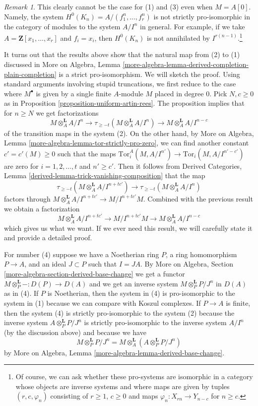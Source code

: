 \documentclass{stacks-project}
\theoremstyle{plain}
\theoremstyle{definition}
\theoremstyle{remark}
\newtheorem{remark}[subsection]{Remark}
\numberwithin{equation}{subsection}
\begin{document}
\begin{remark}
\medskip\noindent
This clearly cannot be the case for (1) and (3) even when $M = A[0]$.
Namely, the system $H^0(K_n) = A/(f_1^n, \ldots, f_r^n)$ is not strictly
pro-isomorphic in the category of modules to the system $A/I^n$ in general.
For example, if we take $A = \mathbf{Z}[x_1, \ldots, x_r]$ and $f_i = x_i$,
then $H^0(K_n)$ is not annihilated by $I^{r(n - 1)}$.\footnote{Of
course, we can ask whether these pro-systems are isomorphic in
a category whose objects are inverse systems and where maps are given
by tuples $(r, c, \varphi_n)$ consisting of $r \geq 1$, $c \geq 0$
and maps $\varphi_n : X_{rn} \to Y_{n - c}$ for $n \geq c$.}

\medskip\noindent
It turns out that the results above show that the natural map from
(2) to (1) discussed in More on Algebra, Lemma
\ref{more-algebra-lemma-derived-completion-plain-completion}
is a strict pro-isomorphism. We will sketch the proof.
Using standard arguments involving stupid truncations, we first reduce
to the case where $M^\bullet$ is given by a single finite $A$-module
$M$ placed in degree $0$. Pick $N, c \geq 0$ as in
Proposition \ref{proposition-uniform-artin-rees}.
The proposition implies that for $n \geq N$ we get factorizations
$$
M \otimes_A^\mathbf{L} A/I^n
\to
\tau_{\geq -t}(M \otimes_A^\mathbf{L} A/I^n)
\to
M \otimes_A^\mathbf{L} A/I^{n - c}
$$
of the transition maps in the system (2). On the other hand, by
More on Algebra, Lemma \ref{more-algebra-lemma-tor-strictly-pro-zero},
we can find another constant $c' = c'(M) \geq 0$ such that the maps
$\text{Tor}_i^A(M, A/I^{n'}) \to \text{Tor}_i(M, A/I^{n' - c'})$
are zero for $i = 1, 2, \ldots, t$ and $n' \geq c'$. Then it follows from
Derived Categories, Lemma \ref{derived-lemma-trick-vanishing-composition}
that the map
$$
\tau_{\geq -t}(M \otimes_A^\mathbf{L} A/I^{n + tc'})
\to
\tau_{\geq -t}(M \otimes_A^\mathbf{L} A/I^n)
$$
factors through $M \otimes_A^\mathbf{L}A/I^{n + tc'} \to M/I^{n + tc'}M$.
Combined with the previous result we obtain a factorization
$$
M \otimes_A^\mathbf{L}A/I^{n + tc'} \to M/I^{n + tc'}M
\to M \otimes_A^\mathbf{L} A/I^{n - c}
$$
which gives us what we want. If we ever need this result, we will carefully
state it and provide a detailed proof.

\medskip\noindent
For number (4) suppose we have a Noetherian ring $P$,
a ring homomorphism $P \to A$, and an ideal $J \subset P$ such that $I = JA$.
By More on Algebra, Section \ref{more-algebra-section-derived-base-change}
we get a functor $M \otimes_P^\mathbf{L} - : D(P) \to D(A)$ and we get
an inverse system $M \otimes_P^\mathbf{L} P/J^n$ in $D(A)$ as in (4).
If $P$ is Noetherian, then the system in (4) is pro-isomorphic
to the system in (1) because we can compare with Koszul complexes.
If $P \to A$ is finite, then the system (4) is strictly pro-isomorphic
to the system (2) because the inverse system $A \otimes_P^\mathbf{L} P/J^n$
is strictly pro-isomorphic to the inverse system $A/I^n$
(by the discussion above) and because we have
$$
M \otimes_P^\mathbf{L} P/J^n = M \otimes_A^\mathbf{L}
(A \otimes_P^\mathbf{L} P/J^n)
$$
by More on Algebra, Lemma \ref{more-algebra-lemma-derived-base-change}.


\end{remark}
\end{document}
